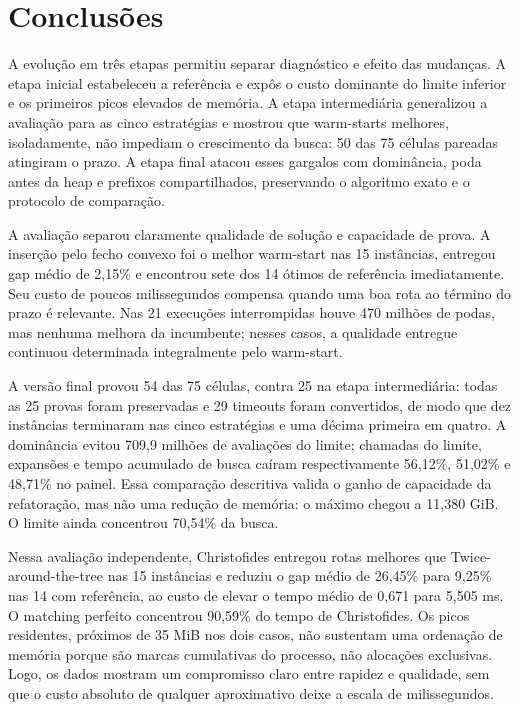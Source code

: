 \documentclass[12pt]{article}
\begin{document}
\section{Conclusões}

A evolução em três etapas permitiu separar diagnóstico e efeito das mudanças. A
etapa inicial estabeleceu a referência e expôs o custo dominante do limite
inferior e os primeiros picos elevados de memória. A etapa intermediária
generalizou a avaliação para as cinco estratégias e mostrou que warm-starts
melhores, isoladamente, não impediam o crescimento da busca: 50 das 75 células
pareadas atingiram o prazo. A etapa final atacou esses gargalos com dominância,
poda antes da heap e prefixos compartilhados, preservando o algoritmo exato e o
protocolo de comparação.

A avaliação separou claramente qualidade de solução e capacidade de prova. A
inserção pelo fecho convexo foi o melhor warm-start nas 15 instâncias, entregou
gap médio de 2,15\% e encontrou sete dos 14 ótimos de referência imediatamente. Seu
custo de poucos milissegundos compensa quando uma boa rota ao término do prazo
é relevante. Nas 21 execuções interrompidas houve 470 milhões de podas, mas
nenhuma melhora da incumbente; nesses casos, a qualidade entregue continuou
determinada integralmente pelo warm-start.

A versão final provou 54 das 75 células, contra 25 na etapa intermediária:
todas as 25 provas foram preservadas e 29 timeouts foram convertidos, de modo
que dez instâncias terminaram nas cinco estratégias e uma décima primeira em
quatro. A dominância evitou 709,9 milhões de avaliações do limite; chamadas do
limite, expansões e tempo acumulado de busca caíram respectivamente 56,12\%,
51,02\% e 48,71\% no painel. Essa comparação descritiva valida o ganho de
capacidade da refatoração, mas não uma redução de memória: o máximo chegou a
11,380 GiB. O limite ainda concentrou 70,54\% da busca.

Nessa avaliação independente, Christofides entregou rotas melhores que
Twice-around-the-tree nas 15 instâncias e reduziu o gap médio de 26,45\% para
9,25\% nas 14 com referência, ao custo de elevar o tempo médio de 0,671 para
5,505 ms. O matching perfeito concentrou 90,59\% do tempo de Christofides. Os
picos residentes, próximos de 35 MiB nos dois casos, não sustentam uma ordenação
de memória porque são marcas cumulativas do processo, não alocações exclusivas.
Logo, os dados mostram um compromisso claro entre rapidez e qualidade, sem que
o custo absoluto de qualquer aproximativo deixe a escala de milissegundos.
\end{document}
